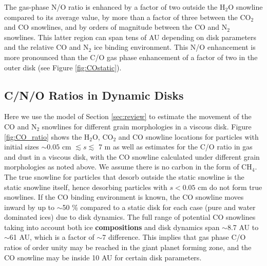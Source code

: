\documentclass[apj]{emulateapj}
\begin{document}
The gas-phase N/O ratio is enhanced by a factor of two outside the H$_2$O snowline compared to its average value, by more than a factor of three between the CO$_2$ and CO snowlines, and by orders of magnitude between the CO and N$_2$ snowlines. This latter region can span tens of AU depending on disk parameters and the relative CO and N$_2$ ice binding environment. This N/O  enhancement is more pronounced than the C/O gas phase enhancement of a factor of two in the outer disk (see Figure \ref{fig:COstatic}). %

\subsection{C/N/O Ratios in Dynamic Disks}
\label{sec:dynamic}



Here we use the model of Section \ref{sec:review} to estimate the movement of the CO and N$_2$ snowlines for different grain morphologies in a viscous disk. Figure \ref{fig:CO_ratio} shows the H$_2$O, CO$_2$ and CO snowline locations for particles with initial sizes $\sim0.05$ cm $\lesssim s \lesssim$ 7 m as well as estimates for the C/O ratio in gas and dust in a viscous disk, with the CO snowline calculated under different grain morphologies as noted above. We assume there is no carbon in the form of CH$_4$. The true snowline for particles that desorb outside the static snowline is the static snowline itself, hence desorbing particles with $s<0.05$ cm do not form true snowlines. If the CO binding environment is known, the CO snowline moves inward by up to $\sim$50 \% compared to a static disk for each case (pure and water dominated ices) due to disk dynamics. The full range of potential CO snowlines taking into account both ice \textbf{compositions} and disk dynamics span $\sim$8.7 AU to $\sim$61 AU, which is a factor of $\sim$7 difference. This implies that gas phase C/O ratios of order unity may be reached in the giant planet forming zone, and the CO snowline may be inside 10 AU for certain disk parameters.  
\end{document}
